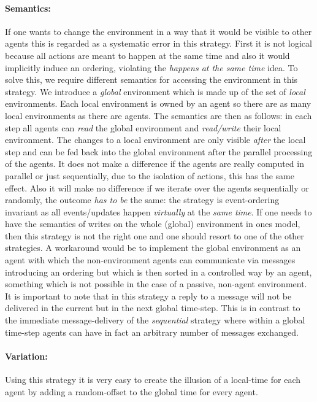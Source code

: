 \paragraph{Semantics:} If one wants to change the environment in a way that it would be visible to other agents this is regarded as a systematic error in this strategy. First it is not logical because all actions are meant to happen at the same time and also it would implicitly induce an ordering, violating the \textit{happens at the same time} idea. To solve this, we require different semantics for accessing the environment in this strategy. We introduce a \textit{global} environment which is made up of the set of \textit{local} environments. Each local environment is owned by an agent so there are as many local environments as there are agents. The semantics are then as follows: in each step all agents can \textit{read} the global environment and \textit{read/write} their local environment. The changes to a local environment are only visible \textit{after} the local step and can be fed back into the global environment after the parallel processing of the agents. 
It does not make a difference if the agents are really computed in parallel or just sequentially, due to the isolation of actions, this has the same effect. Also it will make no difference if we iterate over the agents sequentially or randomly, the outcome \textit{has to be} the same: the strategy is event-ordering invariant as all events/updates happen \textit{virtually} at the \textit{same time}. If one needs to have the semantics of writes on the whole (global) environment in ones model, then this strategy is not the right one and one should resort to one of the other strategies. A workaround would be to implement the global environment as an agent with which the non-environment agents can communicate via messages introducing an ordering but which is then sorted in a controlled way by an agent, something which is not possible in the case of a passive, non-agent environment.
It is important to note that in this strategy a reply to a message will not be delivered in the current but in the next global time-step. This is in contrast to the immediate message-delivery of the \textit{sequential} strategy where within a global time-step agents can have in fact an arbitrary number of messages exchanged.

\paragraph{Variation:} Using this strategy it is very easy to create the illusion of a local-time for each agent by adding a random-offset to the global time for every agent.

